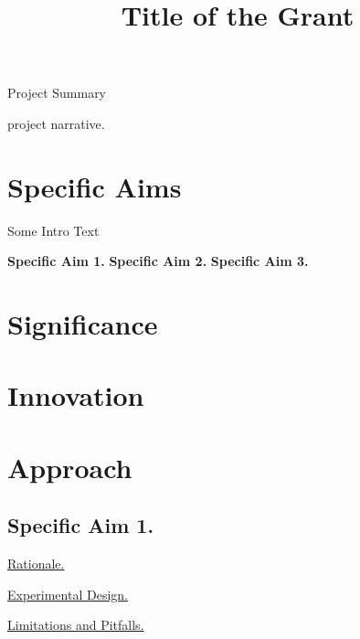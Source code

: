 \documentclass[11pt,notitlepage]{article}
\begin{document}
\title{Title of the Grant}

Project Summary


\newpage
project narrative.


\newpage

\section*{Specific Aims}



Some Intro Text


\textbf{Specific Aim 1. } 
\textbf{Specific Aim 2. } 
\textbf{Specific Aim 3. } 



\newpage
\section*{Significance}

\section*{Innovation}

\section*{Approach}





\subsection*{Specific Aim 1. }

\underline{Rationale.} 

\underline{Experimental Design.} 

\underline{Limitations and Pitfalls.}

\newpage
\raggedright
\end{document}
